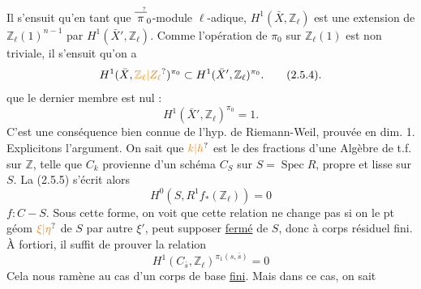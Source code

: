 Il s'ensuit qu'en tant que $\overset{\deleted{\unsure{-}}}{\pi}_0$-module $\ell$-adique, $H^1(\bar X,\mathbb Z_\ell)$ est une extension de $\mathbb Z_\ell(1)^{n-1}$ par $H^1(\bar X',\mathbb Z_\ell)$. Comme l'opération de $\pi_0$ sur $\mathbb Z_\ell(1)$ est non triviale, il s'ensuit  qu'on a
\[
H^1(\bar X,\unsure{\mathbb Z_\ell|Z_\ell})^{\pi_0}\subset H^1(\bar X',\mathbb Z_\ell)^{\pi_0}.\tag*{(2.5.4).}
\]
 que le dernier membre est nul :
\[
H^1(\bar X',\mathbb Z_\ell)^{\pi_0}=1.\tag*{(2.5.5)}
\]
C'est une conséquence bien connue de l'hyp. de Riemann-Weil, prouvée en dim. 1. Explicitons l'argument.   On sait que $\unsure{k|h}$ est le   des fractions d'une  Algèbre  de t.f. sur $\mathbb Z$,  telle que  $C_k$ provienne d'un schéma $C_S$ sur $S=\operatorname{Spec}R$, propre et lisse sur $S$.  La   (2.5.5) s'écrit alors
\[
H^0(S,R^1f_*(\mathbb Z_\ell))=0
\]
$f:C-S$. Sous cette forme, on voit que cette relation  ne change pas si on   le pt géom $\unsure{\xi|\eta}$ de $S$ par   autre $\xi'$,   peut supposer   \uline{fermé}  de $S$, donc à corps résiduel fini.  À fortiori, il suffit de prouver la relation
\[
H^1(C_{\bar s},\mathbb Z_\ell)^{\pi_1(s,\bar s)}=0\tag*{(2.5.6)}
\]
Cela nous ramène au cas d'un corps de base \uline{fini}. Mais dans ce cas, on sait    

